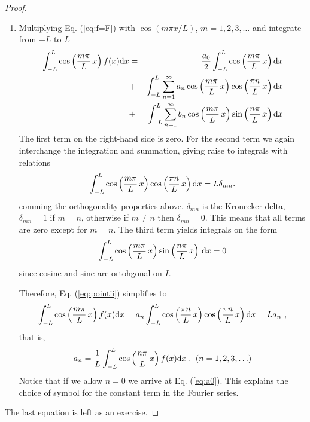 \begin{proof}
\begin{enumerate}
	\item  Multiplying Eq. (\ref{eq:f=F}) with $\cos(m \pi x/L)$, $m=1,2,3, \ldots$ 
		and integrate from $-L$ to $L$
		\begin{eqnarray}
			\int_{-L}^{L}\cos\left(\frac{m\pi }{L} \, x\right) f(x)\mathrm{d} x &=&
				 \frac{a_0}{2} \int_{-L}^L \cos\left(\frac{m\pi }{L} \, x\right) \mathrm{d} x 
				 \nonumber \\
				 &+& \int_{-L}^L \sum_{n=1}^\infty a_n\cos\left(\frac{m\pi }{L} \, x\right) 
				 \cos\left(\frac{\pi n}{L} \, x\right) \mathrm{d} x 
				\nonumber \\
				&+& \int_{-L}^L \sum_{n=1}^\infty b_n \cos\left(\frac{m\pi }{L} \, x\right)   \sin\left(\frac{n\pi }{L} 
				\, x\right) \mathrm{d} x 
				\nonumber \\
			\label{eq:pointii}
		\end{eqnarray}
		The first term on the right-hand side is zero. For the second term 
		we again interchange the integration and summation, giving raise to
		integrals with relations
		\begin{eqnarray}
			\int_{-L}^L \cos\left(\frac{m\pi }{L} \, x\right) \cos\left(\frac{\pi n}{L} \, 
			x\right) \mathrm{d} x = L \delta_{mn} .
		\end{eqnarray}
		comming the orthogonality properties above. $\delta_{mn}$ is the Kronecker delta, 
		$\delta_{mn}=1$ if $m=n$, otherwise if $m \neq n$ then $\delta_{mn}
		= 0$. This means that all terms are zero except for $m=n$. The third term 
		yields integrals on the form
		\begin{eqnarray}
			\int_{-L}^L \cos\left(\frac{m\pi }{L} \, x\right)
			\sin\left(\frac{n\pi }{L}	\, x\right) \, \mathrm{d} x = 0 
		\end{eqnarray}
		since cosine and sine are ortohgonal on $I$. 

		Therefore, Eq. (\ref{eq:pointii}) simplifies to
		\begin{equation}
			\int_{-L}^{L}\cos\left(\frac{m\pi }{L} \, x\right) f(x)\mathrm{d} x  = a_n \int_{-L}^L  
			\cos\left(\frac{\pi n}{L} \, x\right) \cos\left(\frac{\pi n}{L} \, x\right) \mathrm{d} x = L a_n \ , 
		\end{equation}
		that is,
		\begin{equation}
			\label{eq:an}
			a_n = \frac{1}{L} \int_{-L}^L \cos\left(\frac{n\pi }{L} \, x\right)
			f(x)\mathrm{d} x \, . 				\ \ (n=1,2,3, \ldots)
		\end{equation}
		Notice that if we allow $n=0$ we arrive at Eq. (\ref{eq:a0}). This explains the choice 
		of symbol for the constant term in the Fourier series.
	\end{enumerate}
	The last equation is left as an exercise.
\end{proof}


